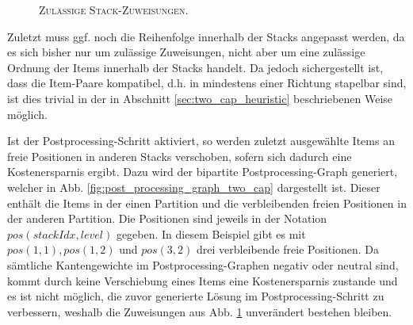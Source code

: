 \begin{figure}[H]
  \centering
    \caption{\textsc{Zulässige Stack-Zuweisungen.}}
    \label{fig:stacking_solution}
\end{figure}

\vfill
\pagebreak

Zuletzt muss ggf. noch die Reihenfolge innerhalb der Stacks angepasst werden, da es sich bisher nur um zulässige Zuweisungen,
nicht aber um eine zulässige Ordnung der Items innerhalb der Stacks handelt.
Da jedoch sichergestellt ist, dass die Item-Paare kompatibel, d.h. in mindestens einer Richtung stapelbar sind,
ist dies trivial in der in Abschnitt \ref{sec:two_cap_heuristic} beschriebenen Weise möglich.

Ist der Postprocessing-Schritt aktiviert, so werden zuletzt ausgewählte Items an freie Positionen in anderen Stacks
verschoben, sofern sich dadurch eine Kostenersparnis ergibt. Dazu wird der bipartite Postprocessing-Graph generiert, welcher in
Abb. \ref{fig:post_processing_graph_two_cap} dargestellt ist. Dieser enthält die Items in der einen Partition
und die verbleibenden freien Positionen in der anderen Partition. Die Positionen sind jeweils in der Notation
$pos(stackIdx, level)$ gegeben.
In diesem Beispiel gibt es mit $pos(1, 1), pos(1, 2)$ und $pos(3, 2)$ drei verbleibende freie Positionen.
Da sämtliche Kantengewichte im Postprocessing-Graphen negativ oder neutral sind, kommt durch keine Verschiebung
eines Items eine Kostenersparnis zustande und es ist nicht möglich, die zuvor generierte Lösung im Postprocessing-Schritt zu
verbessern, weshalb die Zuweisungen aus Abb. \ref{fig:stacking_solution} unverändert bestehen bleiben.

